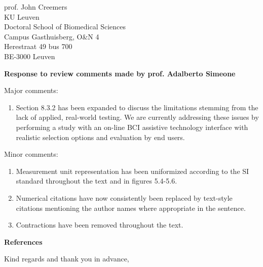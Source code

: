 \documentclass{letter}
\newcommand{\reply}[1]{%
	\textbf{Response to review comments made by prof. #1}

}
\begin{document}
\begin{letter}{%
	prof. John Creemers \\
	KU Leuven \\
	Doctoral School of Biomedical Sciences \\
	Campus Gasthuisberg, O\&N 4 \\
	Herestraat 49 bus 700 \\
	BE-3000 Leuven

}
\clearpage

\reply{Adalberto Simeone}
Major comments:
\begin{enumerate}
	\item Section 8.3.2 has been expanded to discuss the limitations stemming
    from the lack of applied, real-world testing.
    We are currently addressing these issues by performing a study with an
    on-line BCI assistive technology interface with realistic selection
    options and evaluation by end users.
\end{enumerate}
Minor comments:
\begin{enumerate}
	\item Measurement unit representation has been uniformized according to the
    SI standard throughout the text and in figures 5.4-5.6.
  \item Numerical citations have now consistently been replaced by text-style citations
    mentioning the author names where appropriate in the sentence.
  \item Contractions have been removed throughout the text.
\end{enumerate}


\textbf{References}

\printbibliography[heading=none]

\closing{Kind regards and thank you in advance,}
\end{letter}
\end{document}
